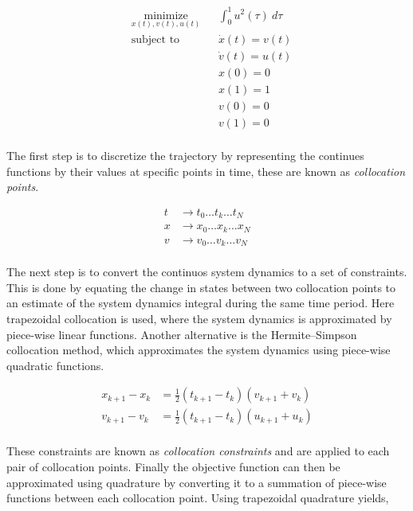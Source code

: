 \begin{equation}
    \begin{aligned}
    & \underset{x(t), v(t), u(t)}{\text{minimize}}
    & & \int_{0}^{1}  u^2(\tau)\ d\tau \\
    & \text{subject to}
    & & \dot x(t) = v(t) \\
    & & & \dot v(t) = u(t) \\
    & & & x(0) = 0 \\
    & & & x(1) = 1 \\
    & & & v(0) = 0 \\
    & & & v(1) = 0 \\
\end{aligned}
\label{eq:tocl_objective}
\end{equation}

The first step is to discretize the trajectory by representing the continues functions by their values at specific points in time, these are known as \emph{collocation points}.

\begin{align*}
    t &\rightarrow t_0 \dots t_k \dots t_N \\
    x &\rightarrow x_0 \dots x_k \dots x_N \\
    v &\rightarrow v_0 \dots v_k \dots v_N \\
\end{align*}

The next step is to convert the continuos system dynamics to a set of constraints. This is done by equating the change in states between two collocation points to an estimate of the system dynamics integral during the same time period. Here trapezoidal collocation is used, where the system dynamics is approximated by piece-wise linear functions. Another alternative is the Hermite–Simpson collocation method, which approximates the system dynamics using piece-wise quadratic functions.

\begin{align}
    x_{k+1} - x_k &= \frac{1}{2} (t_{k+1} - t_k) (v_{k+1} + v_k) \\
    v_{k+1} - v_k &= \frac{1}{2} (t_{k+1} - t_k) (u_{k+1} + u_k) \\
\end{align}

These constraints are known as \emph{collocation constraints} and are applied to each pair of collocation points. Finally the objective function can then be approximated using quadrature by converting it to a summation of piece-wise functions between each collocation point. Using trapezoidal quadrature yields,


